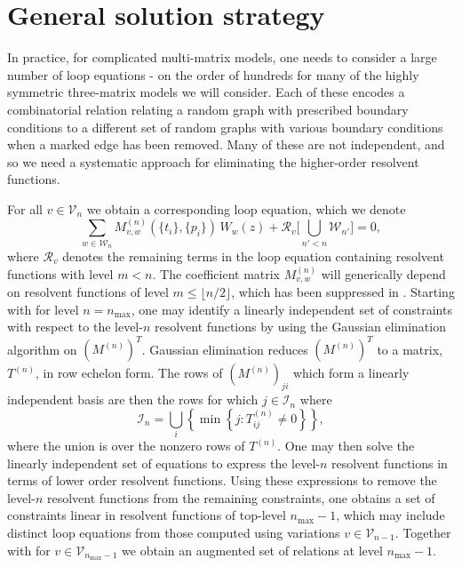 \section{General solution strategy}

In practice, for complicated multi-matrix models, one needs to consider a large number of loop
equations - on the order of hundreds for many of the highly symmetric three-matrix models we will
consider. Each of these encodes a combinatorial relation relating a random graph with prescribed
boundary conditions to a different set of random graphs with various boundary conditions when a
marked edge has been removed. Many of these are not independent, and so we need a systematic
approach for eliminating the higher-order resolvent functions.

For all $v\in \mathcal{V}_n$ we obtain a corresponding loop equation, which we denote
%
\begin{equation}
    \label{loopEq}
    \sum_{w\in\mathcal{W}_n} M_{v,w}^{(n)}\left(\{t_i\},\{p_i\}\right) \, W_{w}(z) + \mathcal{R}_v \big[ \bigcup_{n'<n} \mathcal{W}_{n'} \big] = 0,
\end{equation}
%
where $\mathcal{R}_v$ denotes the remaining terms in the loop equation containing resolvent
functions with level $m < n$. The coefficient matrix $M^{(n)}_{v,w}$ will generically depend on
resolvent functions of level $m \leqslant \lfloor n/2 \rfloor$, which has been suppressed in
. Starting with  for level $n=n_{\mathrm{max}}$, one may identify a
linearly independent set of constraints with respect to the level-$n$ resolvent functions by using
the Gaussian elimination algorithm on $(M^{(n)})^T$. Gaussian elimination reduces $(M^{(n)})^T$ to
a matrix, $T^{(n)}$, in row echelon form. The rows of $(M^{(n)})_{ji}$ which form a linearly
independent basis are then the rows for which $j\in\mathcal{I}_n$ where
%
\begin{equation}
    \label{linInd}
    \mathcal{I}_n = \bigcup_i \left\{ \min\left\{ j : T_{ij}^{(n)} \neq 0 \right\} \right\},
\end{equation}
%
where the union is over the nonzero rows of $T^{(n)}$. One may then solve the linearly independent
set of equations to express the level-$n$ resolvent functions in terms of lower order resolvent
functions. Using these expressions to remove the level-$n$ resolvent functions from the remaining
constraints, one obtains a set of constraints linear in resolvent functions of top-level
$n_{\mathrm{max}}-1$, which may include distinct loop equations from those computed using
variations $v\in\mathcal{V}_{n-1}$. Together with  for
$v\in\mathcal{V}_{n_{\mathrm{max}}-1}$ we obtain an augmented set of relations at level
$n_{\mathrm{max}}-1$.

